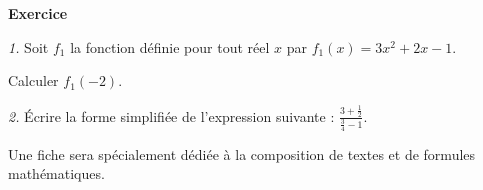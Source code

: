 \begin{CadreExemple}
{\Large\bfseries Exercice}

\textit{1.} Soit $f_1$ la fonction définie pour tout réel $x$ par $f_1(x) = 3x^2 + 2x - 1$.\par Calculer $f_1(-2)$.\par
\textit{2.} \'Ecrire la forme simplifiée de l'expression suivante : $\textstyle{\frac{3 + \frac 1 2}{\frac 34 - 1}}$.
\end{CadreExemple}

\begin{info}
    Une fiche sera spécialement dédiée à la composition de textes et de formules mathématiques.
\end{info}
